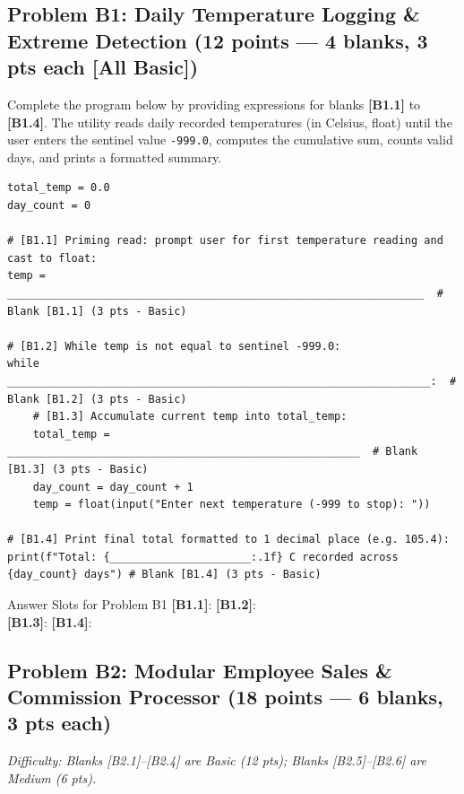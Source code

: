 \documentclass[11pt,a4paper]{article}
\begin{document}
\subsection*{Problem B1: Daily Temperature Logging \& Extreme Detection (12 points --- 4 blanks, 3 pts each [All Basic])}
Complete the program below by providing expressions for blanks \textbf{[B1.1]} to \textbf{[B1.4]}.
The utility reads daily recorded temperatures (in Celsius, float) until the user enters the sentinel value \texttt{-999.0}, computes the cumulative sum, counts valid days, and prints a formatted summary.

\begin{lstlisting}
total_temp = 0.0
day_count = 0

# [B1.1] Priming read: prompt user for first temperature reading and cast to float:
temp = _________________________________________________________________  # Blank [B1.1] (3 pts - Basic)

# [B1.2] While temp is not equal to sentinel -999.0:
while __________________________________________________________________:  # Blank [B1.2] (3 pts - Basic)
    # [B1.3] Accumulate current temp into total_temp:
    total_temp = _______________________________________________________  # Blank [B1.3] (3 pts - Basic)
    day_count = day_count + 1
    temp = float(input("Enter next temperature (-999 to stop): "))

# [B1.4] Print final total formatted to 1 decimal place (e.g. 105.4):
print(f"Total: {______________________:.1f} C recorded across {day_count} days") # Blank [B1.4] (3 pts - Basic)
\end{lstlisting}

\begin{answerbox}[height=1.8cm]{Answer Slots for Problem B1}
\textbf{[B1.1]}: \dotfill \quad \textbf{[B1.2]}: \dotfill\\[1.5mm]
\textbf{[B1.3]}: \dotfill \quad \textbf{[B1.4]}: \dotfill
\end{answerbox}

\newpage


\subsection*{Problem B2: Modular Employee Sales \& Commission Processor (18 points --- 6 blanks, 3 pts each)}
\textit{Difficulty: Blanks [B2.1]--[B2.4] are Basic (12 pts); Blanks [B2.5]--[B2.6] are Medium (6 pts).}
\end{document}
